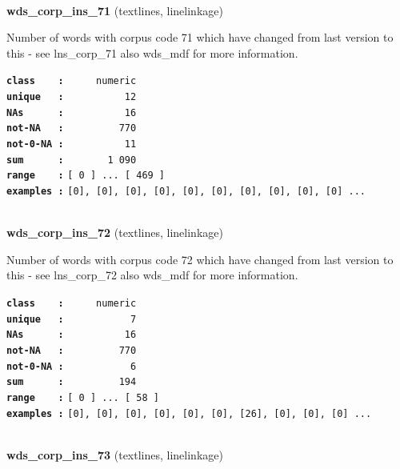 \documentclass[]{article}
\begin{document}
~

\textbf{wds\_corp\_ins\_71} (textlines, linelinkage)

Number of words with corpus code 71 which have changed from last version
to this - see lns\_corp\_71 also wds\_mdf for more information.

\textbf{\texttt{class\ \ \ \ :}} \texttt{~~~~~numeric}\\
\textbf{\texttt{unique\ \ \ :}} \texttt{~~~~~~~~~~12}\\
\textbf{\texttt{NAs\ \ \ \ \ \ :}} \texttt{~~~~~~~~~~16}\\
\textbf{\texttt{not-NA\ \ \ :}} \texttt{~~~~~~~~~770}\\
\textbf{\texttt{not-0-NA\ :}} \texttt{~~~~~~~~~~11}\\
\textbf{\texttt{sum\ \ \ \ \ \ :}} \texttt{~~~~~~~1~090}\\
\textbf{\texttt{range\ \ \ \ :}}
\texttt{{[}\ 0\ {]}\ ...\ {[}\ 469\ {]}}\\
\textbf{\texttt{examples\ :}}
\texttt{{[}0{]},\ {[}0{]},\ {[}0{]},\ {[}0{]},\ {[}0{]},\ {[}0{]},\ {[}0{]},\ {[}0{]},\ {[}0{]},\ {[}0{]}\ ...}\\

~

\textbf{wds\_corp\_ins\_72} (textlines, linelinkage)

Number of words with corpus code 72 which have changed from last version
to this - see lns\_corp\_72 also wds\_mdf for more information.

\textbf{\texttt{class\ \ \ \ :}} \texttt{~~~~~numeric}\\
\textbf{\texttt{unique\ \ \ :}} \texttt{~~~~~~~~~~~7}\\
\textbf{\texttt{NAs\ \ \ \ \ \ :}} \texttt{~~~~~~~~~~16}\\
\textbf{\texttt{not-NA\ \ \ :}} \texttt{~~~~~~~~~770}\\
\textbf{\texttt{not-0-NA\ :}} \texttt{~~~~~~~~~~~6}\\
\textbf{\texttt{sum\ \ \ \ \ \ :}} \texttt{~~~~~~~~~194}\\
\textbf{\texttt{range\ \ \ \ :}}
\texttt{{[}\ 0\ {]}\ ...\ {[}\ 58\ {]}}\\
\textbf{\texttt{examples\ :}}
\texttt{{[}0{]},\ {[}0{]},\ {[}0{]},\ {[}0{]},\ {[}0{]},\ {[}0{]},\ {[}26{]},\ {[}0{]},\ {[}0{]},\ {[}0{]}\ ...}\\

~

\textbf{wds\_corp\_ins\_73} (textlines, linelinkage)
\end{document}
